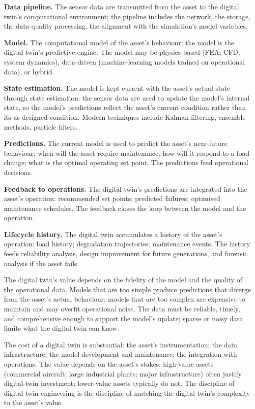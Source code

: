 \textbf{Data pipeline.} The sensor data are transmitted from the asset to the digital twin's computational environment; the pipeline includes the network, the storage, the data-quality processing, the alignment with the simulation's model variables.

\textbf{Model.} The computational model of the asset's behaviour; the model is the digital twin's predictive engine. The model may be physics-based (FEA; CFD; system dynamics), data-driven (machine-learning models trained on operational data), or hybrid.

\textbf{State estimation.} The model is kept current with the asset's actual state through state estimation: the sensor data are used to update the model's internal state, so the model's predictions reflect the asset's current condition rather than its as-designed condition. Modern techniques include Kalman filtering, ensemble methods, particle filters.

\textbf{Predictions.} The current model is used to predict the asset's near-future behaviour: when will the asset require maintenance; how will it respond to a load change; what is the optimal operating set point. The predictions feed operational decisions.

\textbf{Feedback to operations.} The digital twin's predictions are integrated into the asset's operation: recommended set points; predicted failures; optimised maintenance schedules. The feedback closes the loop between the model and the operation.

\textbf{Lifecycle history.} The digital twin accumulates a history of the asset's operation: load history; degradation trajectories; maintenance events. The history feeds reliability analysis, design improvement for future generations, and forensic analysis if the asset fails.

The digital twin's value depends on the fidelity of the model and the quality of the operational data. Models that are too simple produce predictions that diverge from the asset's actual behaviour; models that are too complex are expensive to maintain and may overfit operational noise. The data must be reliable, timely, and comprehensive enough to support the model's update; sparse or noisy data limits what the digital twin can know.

The cost of a digital twin is substantial: the asset's instrumentation; the data infrastructure; the model development and maintenance; the integration with operations. The value depends on the asset's stakes: high-value assets (commercial aircraft; large industrial plants; major infrastructure) often justify digital-twin investment; lower-value assets typically do not. The discipline of digital-twin engineering is the discipline of matching the digital twin's complexity to the asset's value.

